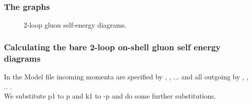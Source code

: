 \subsubsection*{The graphs}

\begin{CellGroup}
\end{CellGroup}


\begin{figure}[ht]
\ifpdf
\else
\setlength\abovecaptionskip{-80pt}
\fi
\begin{center}
\caption{2-loop gluon self-energy diagrams.}
\end{center}
\end{figure}

\subsubsection*{Calculating the bare 2-loop on-shell gluon self energy diagrams}

In the Model file incoming momenta are specified by , , ... and all outgoing
by , , .. .\\
We substitute p1 to p and k1 to -p and do some further substitutions.

